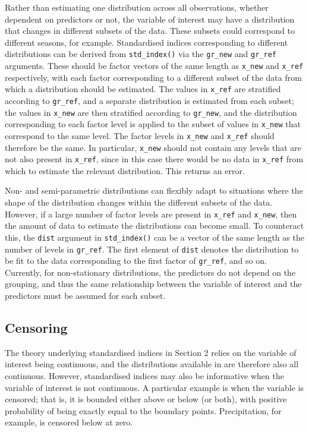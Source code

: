 Rather than estimating one distribution across all observations, whether dependent on predictors or not, the variable of interest may have a distribution that changes in different subsets of the data. These subsets could correspond to different seasons, for example. Standardised indices corresponding to different distributions can be derived from \texttt{std\_index()} via the \texttt{gr\_new} and \texttt{gr\_ref} arguments. These should be factor vectors of the same length as \texttt{x\_new} and \texttt{x\_ref} respectively, with each factor corresponding to a different subset of the data from which a distribution should be estimated. The values in \texttt{x\_ref} are stratified according to \texttt{gr\_ref}, and a separate distribution is estimated from each subset; the values in \texttt{x\_new} are then stratified according to \texttt{gr\_new}, and the distribution corresponding to each factor level is applied to the subset of values in \texttt{x\_new} that correspond to the same level. The factor levels in \texttt{x\_new} and \texttt{x\_ref} should therefore be the same. In particular, \texttt{x\_new} should not contain any levels that are not also present in \texttt{x\_ref}, since in this case there would be no data in \texttt{x\_ref} from which to estimate the relevant distribution. This returns an error.

Non- and semi-parametric distributions can flexibly adapt to situations where the shape of the distribution changes within the different subsets of the data. However, if a large number of factor levels are present in \texttt{x\_ref} and \texttt{x\_new}, then the amount of data to estimate the distributions can become small. To counteract this, the \texttt{dist} argument in \texttt{std\_index()} can be a vector of the same length as the number of levels in \texttt{gr\_ref}. The first element of \texttt{dist} denotes the distribution to be fit to the data corresponding to the first factor of \texttt{gr\_ref}, and so on. Currently, for non-stationary distributions, the predictors do not depend on the grouping, and thus the same relationship between the variable of interest and the predictors must be assumed for each subset.

\subsection{Censoring}\label{censoring}

The theory underlying standardised indices in Section 2 relies on the variable of interest being continuous, and the distributions available in  are therefore also all continuous. However, standardised indices may also be informative when the variable of interest is not continuous. A particular example is when the variable is censored; that is, it is bounded either above or below (or both), with positive probability of being exactly equal to the boundary points. Precipitation, for example, is censored below at zero.

